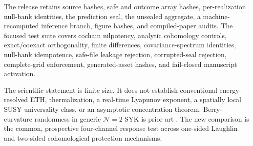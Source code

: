 \documentclass[aps,prl,onecolumn,superscriptaddress,longbibliography,floatfix]{revtex4-2}
\begin{document}
The release retains source hashes, safe and outcome array hashes, per-realization null-bank identities, the prediction seal, the unsealed aggregate, a machine-recomputed inference branch, figure hashes, and compiled-paper audits. The focused test suite covers cochain nilpotency, analytic cohomology controls, exact/coexact orthogonality, finite differences, covariance-spectrum identities, null-bank idempotence, safe-file leakage rejection, corrupted-seal rejection, complete-grid enforcement, generated-asset hashes, and fail-closed manuscript activation.

The scientific statement is finite size. It does not establish conventional energy-resolved ETH, thermalization, a real-time Lyapunov exponent, a spatially local SUSY universality class, or an asymptotic concentration theorem. Berry-curvature randomness in generic \(\mathcal N=2\) SYK is prior art \cite{chen2026berry,chen2024bps}. The new comparison is the common, prospective four-channel response test across one-sided Laughlin and two-sided cohomological protection mechanisms.


\end{document}
